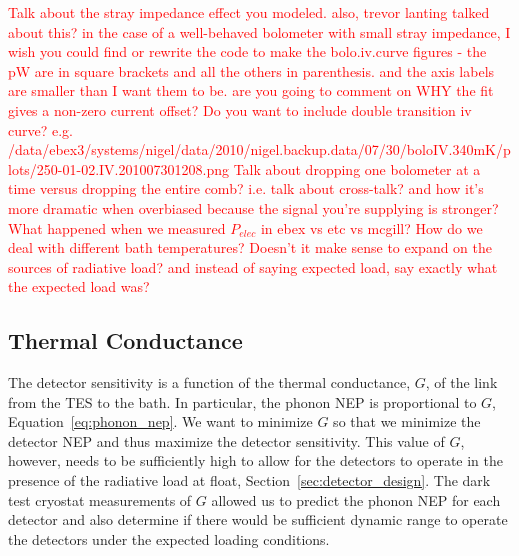 \textcolor{red}{Talk about the stray impedance effect you modeled. also, trevor lanting talked about this? in the case of a well-behaved bolometer with small stray impedance, \cite{Lanting2006}  }\textcolor{red}{I wish you could find or rewrite the code to make the bolo.iv.curve figures - the pW are in square brackets and all the others in parenthesis. and the axis labels are smaller than I want them to be.}
\textcolor{red}{are you going to comment on WHY the fit gives a non-zero current offset?}
\textcolor{red}{Do you want to include double transition iv curve? e.g. /data/ebex3/systems/nigel/data/2010/nigel.backup.data/07/30/boloIV.340mK/plots/250-01-02.IV.201007301208.png}
\textcolor{red}{Talk about dropping one bolometer at a time versus dropping the entire comb? i.e. talk about cross-talk? and how it's more dramatic when overbiased because the signal you're supplying is stronger?}
\textcolor{red}{ What happened when we measured $P_{elec}$ in ebex vs etc vs mcgill? How do we deal with different bath temperatures?}
\textcolor{red}{Doesn't it make sense to expand on the sources of radiative load? and instead of saying expected load, say exactly what the expected load was?}

\subsection{Thermal Conductance}
\label{sec:thermal_conductance}

The detector sensitivity is a function of the thermal conductance, $G$, of the link from the TES to the bath. %
In particular, the phonon \ac{NEP} is proportional to $G$, Equation~\ref{eq:phonon_nep}. 
We want to minimize $G$ so that we minimize the detector \ac{NEP} and thus maximize the detector sensitivity. 
This value of $G$, however, needs to be sufficiently high to allow for the detectors to operate in the presence of the radiative load at float, Section~\ref{sec:detector_design}. 
The dark test cryostat measurements of $G$ allowed us to predict the phonon \ac{NEP} for each detector and also determine if there would be sufficient dynamic range to operate the detectors under the expected loading conditions. 

